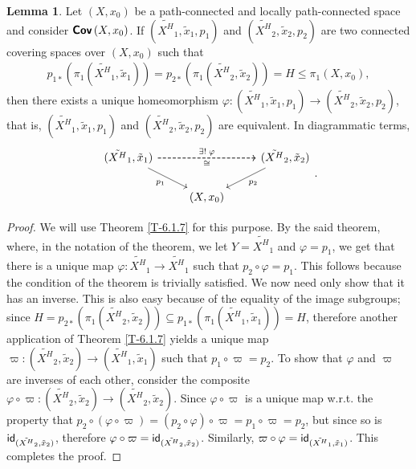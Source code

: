 \documentclass[letterpaper,11pt,twoside]{article}
\theoremstyle{definition}
\theoremstyle{definition}
\theoremstyle{definition}
\theoremstyle{definition}
\newtheorem{lemma}[proposition]{\textbf{Lemma}}
\theoremstyle{definition}
\theoremstyle{definition}
\theoremstyle{remark}
\theoremstyle{definition}
\newcommand{\cat}[1]{{\fontfamily{lmss}\selectfont 
		\text{\textbf{#1}}
}}
\newcommand{\isom}{\cong}
\newcommand{\id}[1]{{\fontfamily{lmss}\selectfont 
		\text{id}_{#1}
}}
\newcommand{\Cov}[1]{\cat{Cov}\left (#1\right )}
\begin{document}
\begin{lemma}\label{L-6.1.8}
	Let $ (X,x_0) $ be a path-connected and locally path-connected space and consider $ \Cov{X,x_0} $. If $ (\tilde{X^{H}}_1, \tilde{x}_1, p_1) $ and $ (\tilde{X^{H}}_2, \tilde{x}_2, p_2) $ are two connected covering spaces over $ (X,x_0) $ such that 
	\begin{align*}
		p_{1*}(\pi_1(\tilde{X^{H}}_1,\tilde{x}_1)) = p_{2*}(\pi_1(\tilde{X^{H}}_2,\tilde{x}_2)) = H \le \pi_1(X,x_0),
	\end{align*}
	then there exists a unique homeomorphism $ \varphi:  (\tilde{X^{H}}_1, \tilde{x}_1, p_1) \to  (\tilde{X^{H}}_2, \tilde{x}_2, p_2)  $, that is, $ (\tilde{X^{H}}_1,\tilde{x}_1,p_1) $ and $ (\tilde{X^{H}}_2,\tilde{x}_2,p_2)  $ are equivalent. In diagrammatic terms, 
\[\begin{tikzcd}
	{(\tilde{X^H}_1,\tilde{x}_1)} && {(\tilde{X^H}_2,\tilde{x}_2)} \\
	& {(X,x_0)}
	\arrow["{p_1}"', from=1-1, to=2-2]
	\arrow["{p_2}", from=1-3, to=2-2]
	\arrow["{\exists !\; \varphi}", dashed, from=1-1, to=1-3]
	\arrow["\isom"', dashed, from=1-1, to=1-3]
\end{tikzcd}.\]
\end{lemma}
\begin{proof}
	We will use Theorem \ref{T-6.1.7} for this purpose. By the said theorem, where, in the notation of the theorem, we let $ Y = \tilde{X^{H}}_1 $ and $ \varphi = p_1 $, we get that there is a unique map $ \varphi: \tilde{X^{H}}_1 \to \tilde{X^{H}}_1 $ such that $ p_2 \circ \varphi = p_1 $. This follows because the condition of the theorem is trivially satisfied. We now need only show that it has an inverse. This is also easy because of the equality of the image subgroups; since $ H = p_{2*}(\pi_1(\tilde{X^{H}}_2,\tilde{x}_2))  \subseteq p_{1*}(\pi_1(\tilde{X^{H}}_1,\tilde{x}_1)) = H $, therefore another application of Theorem \ref{T-6.1.7} yields a unique map $ \varpi : (\tilde{X^{H}}_2 ,\tilde{x}_2) \to (\tilde{X^{H}}_1,\tilde{x}_1)$ such that $ p_1\circ \varpi = p_2 $. To show that $ \varphi $ and $ \varpi $ are inverses of each other, consider the composite $ \varphi \circ \varpi : (\tilde{X^{H}}_2,\tilde{x}_2) \to (\tilde{X^{H}}_2,\tilde{x}_2)$. Since $ \varphi \circ \varpi $ is a unique map w.r.t. the property that $ p_2\circ (\varphi\circ \varpi) = (p_2\circ \varphi)\circ \varpi = p_1\circ \varpi = p_2$, but since so is $ \id{(\tilde{X^{H}}_2,\tilde{x}_2)} $, therefore $ \varphi\circ \varpi = \id{(\tilde{X^{H}}_2,\tilde{x}_2)}$. Similarly, $ \varpi \circ \varphi = \id{(\tilde{X^{H}}_1,\tilde{x}_1)}$. This completes the proof.
\end{proof}
\end{document}

